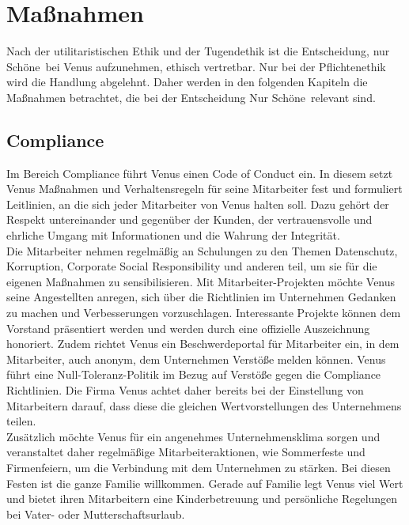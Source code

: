 \documentclass[a4paper, fontsize=12pt, parskip=full, toc=bibliographynumbered]{scrreprt}
\begin{document}




\chapter{Maßnahmen}

Nach der utilitaristischen Ethik und der Tugendethik ist die Entscheidung, nur \glqq Schöne\grqq~bei Venus aufzunehmen, ethisch vertretbar. Nur bei der Pflichtenethik wird die Handlung abgelehnt. Daher werden in den folgenden Kapiteln die Maßnahmen betrachtet, die bei der Entscheidung \glqq Nur Schöne\grqq~relevant sind.

\section{Compliance}

Im Bereich Compliance führt Venus einen Code of Conduct ein. In diesem setzt Venus Maßnahmen und Verhaltensregeln für seine Mitarbeiter fest und formuliert
Leitlinien, an die sich jeder Mitarbeiter von Venus halten soll. Dazu gehört der Respekt untereinander und gegenüber der Kunden, der vertrauensvolle und ehrliche Umgang mit Informationen und die Wahrung der Integrität.\\
Die Mitarbeiter nehmen regelmäßig an Schulungen zu den Themen Datenschutz, Korruption, Corporate Social Responsibility und anderen teil, um sie für die eigenen Maßnahmen zu sensibilisieren. Mit Mitarbeiter-Projekten möchte Venus seine Angestellten anregen, sich über die Richtlinien im Unternehmen Gedanken zu machen und Verbesserungen vorzuschlagen. Interessante Projekte können dem Vorstand präsentiert werden und werden durch eine offizielle Auszeichnung honoriert. Zudem richtet Venus ein Beschwerdeportal für Mitarbeiter ein, in dem Mitarbeiter, auch anonym, dem Unternehmen Verstöße melden können. Venus führt eine Null-Toleranz-Politik im Bezug auf Verstöße gegen die Compliance Richtlinien. Die Firma Venus achtet daher bereits bei der Einstellung von Mitarbeitern darauf, dass diese die gleichen Wertvorstellungen des Unternehmens teilen.\\
Zusätzlich möchte Venus für ein angenehmes Unternehmensklima sorgen und veranstaltet daher regelmäßige Mitarbeiteraktionen, wie Sommerfeste und Firmenfeiern, um die Verbindung mit dem Unternehmen zu stärken. Bei diesen Festen ist die ganze Familie willkommen. Gerade auf Familie legt Venus viel Wert und bietet ihren Mitarbeitern eine Kinderbetreuung und persönliche Regelungen bei Vater- oder Mutterschaftsurlaub.
\end{document}
